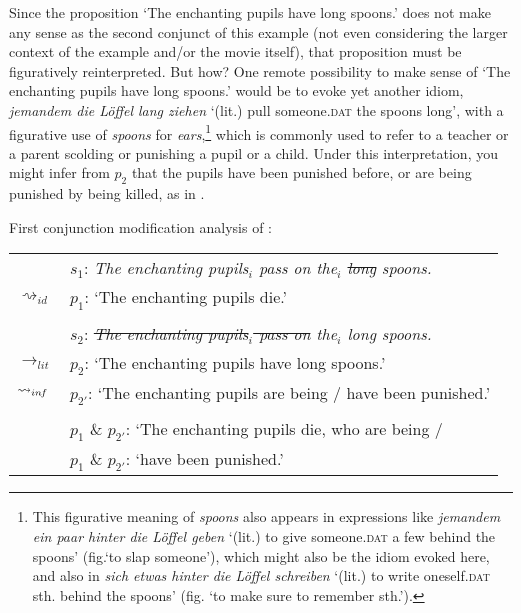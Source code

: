 \documentclass[output=paper]{langsci/langscibook}
\begin{document}
\noindent Since the proposition `The enchanting pupils have long spoons.' does not make any sense as the second conjunct of this example (not even considering the larger context of the example and/or the movie itself), that proposition must be figuratively reinterpreted. But how? One remote possibility to make sense of `The enchanting pupils have long spoons.' would be to evoke yet another idiom, \textit{jemandem die Löffel lang ziehen} `(lit.) pull someone.\textsc{dat} the spoons long', with a figurative use of \textit{spoons} for \textit{ears},\footnote{This figurative meaning of \textit{spoons} also appears in expressions like \textit{jemandem ein paar hinter die Löffel geben} `(lit.) to give someone.\textsc{dat} a few behind the spoons' (fig.\@ `to slap someone'), which might also be the idiom evoked here, and also in \textit{sich etwas hinter die Löffel schreiben} `(lit.) to write oneself.\textsc{dat} sth. behind the spoons' (fig. `to make sure to remember sth.').}
which is commonly used to refer to a teacher or a parent scolding or punishing a pupil or a child. Under this interpretation, you might infer from $p_{2}$ that the pupils have been punished before, or are being punished by being killed, as in . 

\ea \label{analysis long spoons 1} 
First conjunction modification analysis of : \\
\vspace{5pt}
\begin{tabular}{ll}
								& 	$s_{1}$: \hspace{4pt} \textit{The enchanting pupils$_{i}$ pass on the$_{i}$ \sout{long} spoons.} \\
$\rightsquigarrow_{id}$				&	$p_{1}$: \hspace{1pt} `The enchanting pupils die.' \\
\vspace{-5pt} \\
								& 	$s_{2}$: \hspace{4pt} \textit{\sout{The enchanting pupils$_{i}$ pass on} the$_{i}$ long spoons.} \\
$\rightarrow_{lit}$					&	$p_{2}$: \hspace{1pt} `The enchanting pupils have long spoons.' \\
$\rightsquigarrow_{in\hspace{-0.8pt} f}$	&	$p_{2'}$: \hspace{-1.5pt} `The enchanting pupils are being / have been punished.' \\
\vspace{-5pt} \\
								&	$p_{1}$ \& $p_{2'}$: `The enchanting pupils die, who are being / \\
								&	{\white $p_{1}$ \& $p_{2'}$: `}have been punished.' \\
\end{tabular}
\z
\end{document}
